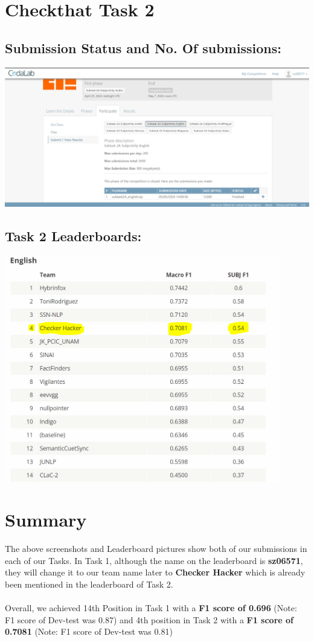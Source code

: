 \documentclass{article}
\begin{document}
\section{\textcolor{sectioncolor}{Checkthat Task 2}}

\subsection{Submission Status and No. Of submissions:}
\includegraphics[width=15cm]{Task2_Status.jpg}

\subsection{Task 2 Leaderboards:}
\includegraphics[width=12cm]{Task2_LeaderBoards.png}

\section{\textcolor{sectioncolor}{Summary}}

The above screenshots and Leaderboard pictures show both of our submissions in each of our Tasks. In Task 1, although the name on the leaderboard is \textbf{sz06571}, they will change it to our team name later to \textbf{Checker Hacker} which is already been mentioned in the leaderboard of Task 2.
\\\\
Overall, we achieved 14th Position in Task 1 with a \textbf{F1 score of 0.696} (Note: F1 score of Dev-test was 0.87) and 4th position in Task 2 with a \textbf{F1 score of 0.7081} (Note: F1 score of Dev-test was 0.81)
\end{document}
